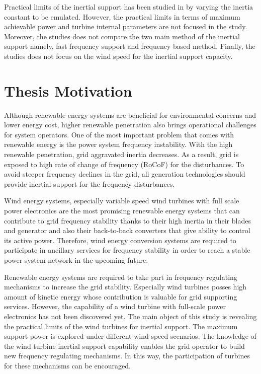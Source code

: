 Practical limits of the inertial support has been studied in \cite{Gonzalez-Longatt2016} by varying the inertia constant to be emulated. However, the practical limits in terms of maximum achievable power and turbine internal parameters are not focused in the study. Moreover, the studies does not compare the two main method of the inertial support namely, fast frequency support and frequency based method. Finally, the studies does not focus on the wind speed for the inertial support capacity. 

\section{Thesis Motivation}
Although renewable energy systems are beneficial for environmental concerns and lower energy cost, higher renewable penetration also brings operational challenges for system operators. One of the most important problem that comes with renewable energy is the power system frequency instability. With the high renewable penetration, grid aggravated inertia decreases. As a result, grid is exposed to high rate of change of frequency (RoCoF) for the disturbances. To avoid steeper frequency declines in the grid, all generation technologies should provide inertial support for the frequency disturbances.\par
Wind energy systems, especially variable speed wind turbines with full scale power electronics are the most promising renewable energy systems that can contribute to grid frequency stability thanks to their high inertia in their blades and generator and also their back-to-back converters that give ability to control its active power. Therefore, wind energy conversion systems are required to participate in ancillary services for frequency stability in order to reach a stable power system network in the upcoming future. \par
Renewable energy systems are required to take part in frequency regulating mechanisms to increase the grid stability. Especially wind turbines posses high amount of kinetic energy whose contribution is valuable for grid supporting services. However, the capability of a wind turbine with full-scale power electronics has not been discovered yet. The main object of this study is revealing the practical limits of the wind turbines for inertial support. The maximum support power is explored under different wind speed scenarios. The knowledge of the wind turbine inertial support capability enables the grid operator to build new frequency regulating mechanisms. In this way, the participation of turbines for these mechanisms can be encouraged. \par
